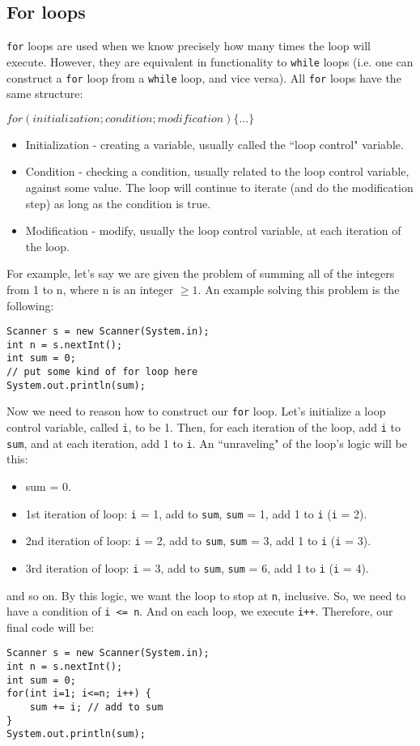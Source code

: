 \subsection{For loops}
\verb|for| loops are used when we know precisely how many times the loop will execute. However, they are equivalent in functionality to \verb|while| loops (i.e. one can construct a \verb|for| loop from a \verb|while| loop, and vice versa). All \verb|for| loops have the same structure:
\begin{center}
$for(initialization; condition; modification) \{...\}$
\end{center}
\begin{itemize}
\item Initialization - creating a variable, usually called the ``loop control" variable.
\item Condition - checking a condition, usually related to the loop control variable, against some value. The loop will continue to iterate (and do the modification step) as long as the condition is true.
\item Modification - modify, usually the loop control variable, at each iteration of the loop.
\end{itemize}
For example, let's say we are given the problem of summing all of the integers from 1 to n, where n is an integer $\ge 1$. An example solving this problem is the following:
\begin{lstlisting}
Scanner s = new Scanner(System.in);
int n = s.nextInt();
int sum = 0;
// put some kind of for loop here
System.out.println(sum);
\end{lstlisting}
Now we need to reason how to construct our \verb|for| loop. Let's initialize a loop control variable, called \verb|i|, to be 1. Then, for each iteration of the loop, add \verb|i| to \verb|sum|, and at each iteration, add 1 to \verb|i|. An ``unraveling" of the loop's logic will be this:
\begin{itemize}
\item sum = 0.
\item 1st iteration of loop: \verb|i| = 1, add to \verb|sum|, \verb|sum| = 1, add 1 to \verb|i| (\verb|i| = 2).
\item 2nd iteration of loop: \verb|i| = 2, add to \verb|sum|, \verb|sum| = 3, add 1 to \verb|i| (\verb|i| = 3).
\item 3rd iteration of loop: \verb|i| = 3, add to \verb|sum|, \verb|sum| = 6, add 1 to \verb|i| (\verb|i| = 4).
\end{itemize}
and so on. By this logic, we want the loop to stop at \verb|n|, inclusive. So, we need to have a condition of \verb|i <= n|. And on each loop, we execute \verb|i++|. Therefore, our final code will be:
\begin{lstlisting}
Scanner s = new Scanner(System.in);
int n = s.nextInt();
int sum = 0;
for(int i=1; i<=n; i++) {
	sum += i; // add to sum
}
System.out.println(sum);
\end{lstlisting}

